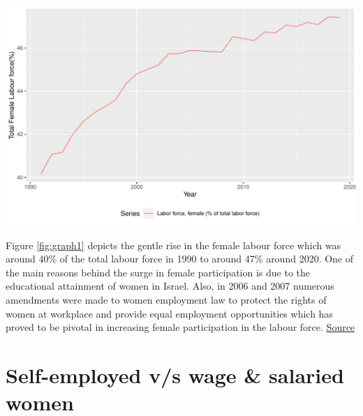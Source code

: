 \documentclass[11pt,a4paper,]{article}
\let\origfigure\figure
\let\endorigfigure\endfigure
\renewenvironment{figure}[1][2] {
    \expandafter\origfigure\expandafter[H]
} {
    \endorigfigure
}%
\begin{document}
\begin{figure}
\centering
\includegraphics{report_files/figure-latex/graph1-1.pdf}
\caption{\label{fig:graph1}\% Female labour force out of total labour force}
\end{figure}

Figure \ref{fig:graph1} depicts the gentle rise in the female labour force which was around 40\% of the total labour force in 1990 to around 47\% around 2020. One of the main reasons behind the surge in female participation is due to the educational attainment of women in Israel. Also, in 2006 and 2007 numerous amendments were made to women employment law to protect the rights of women at workplace and provide equal employment opportunities which has proved to be pivotal in increasing female participation in the labour force. \href{https://mfa.gov.il/MFA/AboutIsrael/State/Law/Pages/Ensuring-equal-rights-for-women-in-Israel.aspx}{Source}

\hypertarget{self-employed-vs-wage-salaried-women}{%
\section{Self-employed v/s wage \& salaried women}\label{self-employed-vs-wage-salaried-women}}
\end{document}
